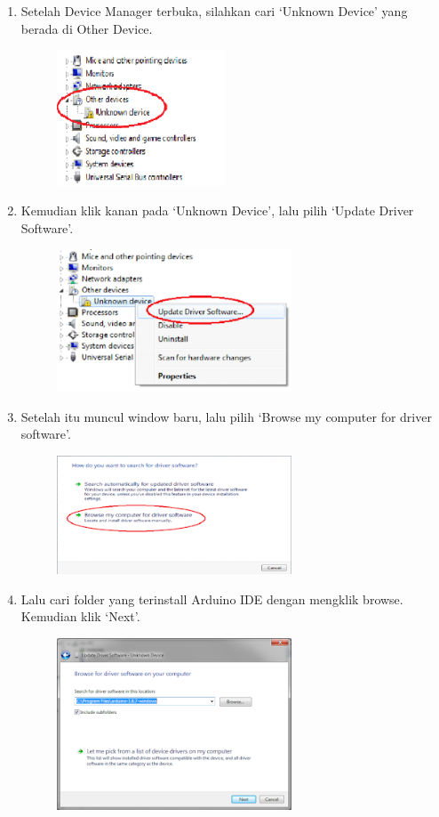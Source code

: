 \begin{enumerate}
\item Setelah Device Manager terbuka, silahkan cari `Unknown Device' yang berada di Other Device.
	\begin{figure}[H]
		\includegraphics[width=5cm]{figures/5/1144124/Teori/4.png}
		\centering
	\end{figure}
\item Kemudian klik kanan pada `Unknown Device', lalu pilih `Update Driver Software'.
	\begin{figure}[H]
		\includegraphics[width=7cm]{figures/5/1144124/Teori/5.png}
		\centering
	\end{figure}
\item Setelah itu muncul window baru, lalu pilih `Browse my computer for driver software'.
	\begin{figure}[H]
		\includegraphics[width=7cm]{figures/5/1144124/Teori/6.png}
		\centering
	\end{figure}
\item Lalu cari folder yang terinstall Arduino IDE dengan mengklik browse. Kemudian klik `Next'.
	\begin{figure}[H]
		\includegraphics[width=7cm]{figures/5/1144124/Teori/7.png}

\end{figure}
\end{enumerate}

